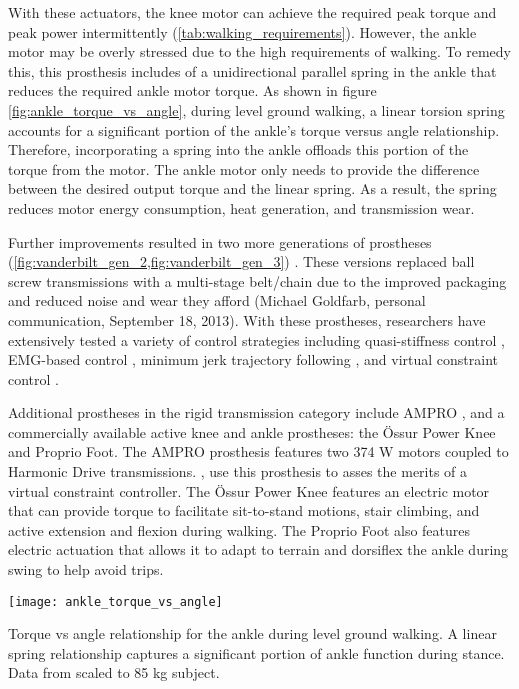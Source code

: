 With these actuators, the knee motor can achieve the required peak torque and
peak power intermittently (\cref{tab:walking_requirements}). However, the ankle
motor may be overly stressed due to the high requirements of walking. To remedy
this, this prosthesis includes of a unidirectional parallel spring in the ankle
that reduces the required ankle motor torque. As shown in figure
\cref{fig:ankle_torque_vs_angle}, during level ground walking, a linear torsion
spring accounts for a significant portion of the ankle's torque versus angle
relationship. Therefore, incorporating a spring into the ankle offloads this
portion of the torque from the motor. The ankle motor only needs to provide the
difference between the desired output torque and the linear spring. As a result,
the spring reduces motor energy consumption, heat generation, and transmission
wear.

Further improvements resulted in two more generations of prostheses
(\cref{fig:vanderbilt_gen_2,fig:vanderbilt_gen_3}) \citep{lawson2013control,
lawson2014robotic}. These versions replaced ball screw transmissions with
a multi-stage belt/chain due to the improved packaging and reduced noise and
wear they afford (Michael Goldfarb, personal communication, September 18, 2013).
With these prostheses, researchers have extensively tested a variety of control
strategies including quasi-stiffness control \citep{sup2009preliminary,
sup2011upslope, lawson2013control, lawson2014robotic, lenzi2014speed}, EMG-based control
\citep{ha2011volitional, varol2010multiclass}, minimum jerk trajectory following
\citep{lenzi2014minimum}, and virtual constraint control
\citep{gregg2014virtual}. 

Additional prostheses in the rigid transmission category include AMPRO
\citep{zhao2016first}, and a commercially available active knee and ankle
prostheses: the Össur Power Knee and Proprio Foot. The AMPRO prosthesis features
two 374 W motors coupled to Harmonic Drive transmissions.
\citet{zhao2016first}, use this prosthesis to asses the merits of a virtual
constraint controller. The Össur Power Knee features an electric motor that can
provide torque to facilitate sit-to-stand motions, stair climbing, and active
extension and flexion during walking. The Proprio Foot also features electric
actuation that allows it to adapt to terrain and dorsiflex the ankle during
swing to help avoid trips. 
\begin{marginfigure}
    \centering
    \texttt{[image: ankle\_torque\_vs\_angle]}
    \caption{Torque vs angle relationship for the ankle during level ground
    walking. A linear spring relationship captures a significant portion of
    ankle function during stance. Data from \citet{winter2009biomechanics}
    scaled to 85 kg subject.}
    \label{fig:ankle_torque_vs_angle}
\end{marginfigure}

